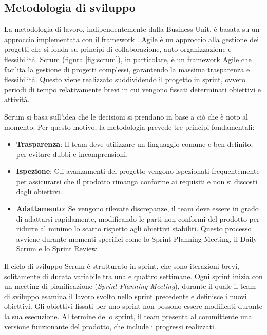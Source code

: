 \subsection{Metodologia di sviluppo}
La metodologia di lavoro, indipendentemente dalla Business Unit, è basata su un approccio  implementata con il framework . Agile è un approccio alla gestione dei progetti che si fonda su principi di collaborazione, auto-organizzazione e flessibilità. Scrum (figura \ref{fig:scrum}), in particolare, è un framework Agile che facilita la gestione di progetti complessi, garantendo la massima trasparenza e flessibilità. Questo viene realizzato suddividendo il progetto in sprint, ovvero periodi di tempo relativamente brevi in cui vengono fissati determinati obiettivi e attività.

Scrum si basa sull'idea che le decisioni si prendano in base a ciò che è noto al momento. Per questo motivo, la metodologia prevede tre principi fondamentali:

\begin{itemize}
    \item \textbf{Trasparenza}: Il team deve utilizzare un linguaggio comune e ben definito, per evitare dubbi e incomprensioni.
    \item \textbf{Ispezione}: Gli avanzamenti del progetto vengono ispezionati frequentemente per assicurarsi che il prodotto rimanga conforme ai requisiti e non si discosti dagli obiettivi.
    \item \textbf{Adattamento}: Se vengono rilevate discrepanze, il team deve essere in grado di adattarsi rapidamente, modificando le parti non conformi del prodotto per ridurre al minimo lo scarto rispetto agli obiettivi stabiliti. Questo processo avviene durante momenti specifici come lo Sprint Planning Meeting, il Daily Scrum e lo Sprint Review.
\end{itemize}

Il ciclo di sviluppo Scrum è strutturato in sprint, che sono iterazioni brevi, solitamente di durata variabile tra una e quattro settimane. Ogni sprint inizia con un meeting di pianificazione (\textit{Sprint Planning Meeting}), durante il quale il team di sviluppo esamina il lavoro svolto nello sprint precedente e definisce i nuovi obiettivi. Gli obiettivi fissati per uno sprint non possono essere modificati durante la sua esecuzione. Al termine dello sprint, il team presenta al committente una versione funzionante del prodotto, che include i progressi realizzati.

